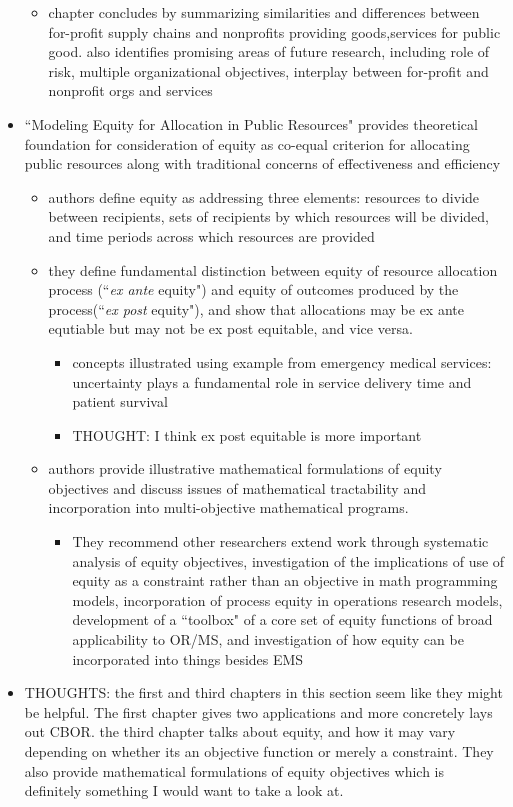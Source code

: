 \documentclass{article}
\begin{document}
\begin{itemize}
\begin{itemize}
	\item chapter concludes by summarizing similarities and differences between for-profit supply chains and nonprofits providing goods,services for public good. also identifies promising areas of future research, including role of risk, multiple organizational objectives, interplay between for-profit and nonprofit orgs and services
	\end{itemize}
\item ``Modeling Equity for Allocation in Public Resources" provides theoretical foundation for consideration of equity as co-equal criterion for allocating public resources along with traditional concerns of effectiveness and efficiency
	\begin{itemize}
	\item authors define equity as addressing three elements: resources to divide between recipients, sets of recipients by which resources will be divided, and time periods across which resources are provided
	\item they define fundamental distinction between equity of resource allocation process (``\textit{ex ante} equity") and equity of outcomes produced by the process(``\textit{ex post} equity"), and show that allocations may be ex ante equtiable but may not be ex post equitable, and vice versa.
		\begin{itemize}
		\item concepts illustrated using example from emergency medical services: uncertainty plays a fundamental role in service delivery time and patient survival
		\item THOUGHT: I think ex post equitable is more important
		\end{itemize}
	\item authors provide illustrative mathematical formulations of equity objectives and discuss issues of mathematical tractability and incorporation into multi-objective mathematical programs. 
		\begin{itemize}
		\item They recommend other researchers extend work through systematic analysis of equity objectives, investigation of the implications of use of equity as a constraint rather than an objective in math programming models, incorporation of process equity in operations research models, development of a ``toolbox" of a core set of equity functions of broad applicability to OR/MS, and investigation of how equity can be incorporated into things besides EMS
		\end{itemize}
	\end{itemize}
\item THOUGHTS: the first and third chapters in this section seem like they might be helpful. The first chapter gives two applications and more concretely lays out CBOR. the third chapter talks about equity, and how it may vary depending on whether its an objective function or merely a constraint. They also provide mathematical formulations of equity objectives which is definitely something I would want to take a look at.
\end{itemize}
%
%
%
%
\end{document}

